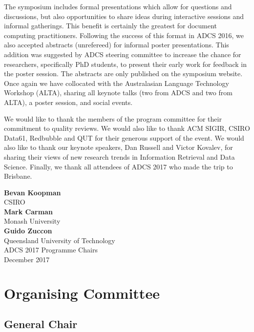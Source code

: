 \documentclass[a4paper]{article}
\begin{document}
The symposium includes formal presentations which allow for questions and
discussions, but also opportunities to share ideas during interactive sessions
and informal gatherings. This benefit is certainly the greatest for document
computing practitioners. Following the success of this format in ADCS 2016, we also accepted abstracts (unrefereed) for informal poster presentations. This addition was suggested by ADCS steering committee to increase the chance for researchers, specifically PhD students, to present their early work for feedback in the poster session. The abstracts are only published on the symposium website. Once again we have collocated with the Australasian
Language Technology Workshop (ALTA), sharing all keynote talks (two from ADCS and two from ALTA), a poster session, and social events.

We would like to thank the members of the program committee for their
commitment to quality reviews. We would also like to thank ACM SIGIR, CSIRO Data61, Redbubble and QUT 
 for their generous support of the event. We would
also like to thank our keynote speakers, Dan Russell and Victor Kovalev, for sharing their views of new
research trends in Information Retrieval and Data Science. Finally, we thank all attendees of
ADCS 2017 who made the trip to Brisbane.

\vspace{1cm}

\begin{flushright}\noindent
\textbf{Bevan Koopman}\\
CSIRO \\[.1in]
\textbf{Mark Carman}\\
Monash University\\[.1in]
\textbf{Guido Zuccon}\\
Queensland University of Technology \\[.1in]
ADCS 2017 Programme Chairs\\
December 2017
\end{flushright}

\newpage


\section*{Organising Committee}


\subsection*{General Chair}
\end{document}

